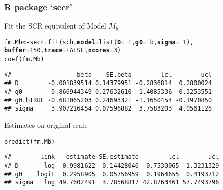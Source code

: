 \documentclass[color=usenames,dvipsnames]{beamer}\usepackage[]{graphicx}\usepackage[]{color}
\makeatletter
\newcommand{\hlnum}[1]{\textcolor[rgb]{0.69,0.494,0}{#1}}%
\newcommand{\hlopt}[1]{\textcolor[rgb]{0,0,0}{#1}}%
\newcommand{\hlstd}[1]{\textcolor[rgb]{0,0,0}{#1}}%
\newcommand{\hlkwb}[1]{\textcolor[rgb]{0,0.341,0.682}{#1}}%
\newcommand{\hlkwc}[1]{\textcolor[rgb]{0,0,0}{\textbf{#1}}}%
\newcommand{\hlkwd}[1]{\textcolor[rgb]{0.004,0.004,0.506}{#1}}%
\newenvironment{kframe}{%
 \def\at@end@of@kframe{}%
 \ifinner\ifhmode%
  \def\at@end@of@kframe{\end{minipage}}%
  \begin{minipage}{\columnwidth}%
 \fi\fi%
 \def\FrameCommand##1{\hskip\@totalleftmargin \hskip-\fboxsep
 \colorbox{shadecolor}{##1}\hskip-\fboxsep
     \hskip-\linewidth \hskip-\@totalleftmargin \hskip\columnwidth}%
 \MakeFramed {\advance\hsize-\width
   \@totalleftmargin\z@ \linewidth\hsize
   \@setminipage}}%
 {\par\unskip\endMakeFramed%
 \at@end@of@kframe}
\newenvironment{knitrout}{}{} %
\makeatother
\begin{document}
\begin{frame}[fragile]
  \frametitle{R package `secr'}
  Fit the SCR equivalent of Model $M_b$
\begin{knitrout}\scriptsize
{}\color{fgcolor}\begin{kframe}
\begin{alltt}
\hlstd{fm.Mb} \hlkwb{<-} \hlkwd{secr.fit}\hlstd{(sch,} \hlkwc{model}\hlstd{=}\hlkwd{list}\hlstd{(}\hlkwc{D}\hlstd{=}\hlopt{~}\hlnum{1}\hlstd{,} \hlkwc{g0}\hlstd{=}\hlopt{~}\hlstd{b,} \hlkwc{sigma}\hlstd{=}\hlopt{~}\hlnum{1}\hlstd{),}
                  \hlkwc{buffer}\hlstd{=}\hlnum{150}\hlstd{,} \hlkwc{trace}\hlstd{=}\hlnum{FALSE}\hlstd{,} \hlkwc{ncores}\hlstd{=}\hlnum{3}\hlstd{)}
\hlkwd{coef}\hlstd{(fm.Mb)}
\end{alltt}
\begin{verbatim}
##                  beta    SE.beta        lcl        ucl
## D        -0.001839514 0.14379951 -0.2836814  0.2800024
## g0       -0.866944349 0.27632610 -1.4085336 -0.3253551
## g0.bTRUE -0.681065203 0.24693321 -1.1650454 -0.1970850
## sigma     3.907216454 0.07596882  3.7583203  4.0561126
\end{verbatim}
\end{kframe}
\end{knitrout}
\pause
\vfill
Estimates on original scale
\begin{knitrout}\scriptsize
{}\color{fgcolor}\begin{kframe}
\begin{alltt}
\hlkwd{predict}\hlstd{(fm.Mb)}
\end{alltt}
\begin{verbatim}
##        link   estimate SE.estimate        lcl        ucl
## D       log  0.9981622  0.14428046  0.7530065  1.3231329
## g0    logit  0.2958905  0.05756959  0.1964655  0.4193712
## sigma   log 49.7602491  3.78568817 42.8763461 57.7493796
\end{verbatim}
\end{kframe}
\end{knitrout}
\end{frame}
\end{document}
